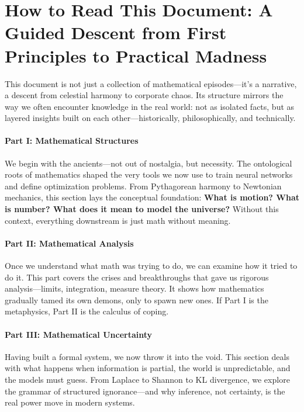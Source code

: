 \section{How to Read This Document: A Guided Descent from First Principles to Practical Madness}

This document is not just a collection of mathematical episodes—it’s a narrative, a descent from celestial harmony to corporate chaos. Its structure mirrors the way we often encounter knowledge in the real world: not as isolated facts, but as layered insights built on each other—historically, philosophically, and technically.

\paragraph{Part I: Mathematical Structures}
We begin with the ancients—not out of nostalgia, but necessity. The ontological roots of mathematics shaped the very tools we now use to train neural networks and define optimization problems. From Pythagorean harmony to Newtonian mechanics, this section lays the conceptual foundation: \textbf{What is motion? What is number? What does it mean to model the universe?} Without this context, everything downstream is just math without meaning.

\paragraph{Part II: Mathematical Analysis}
Once we understand what math was trying to do, we can examine how it tried to do it. This part covers the crises and breakthroughs that gave us rigorous analysis—limits, integration, measure theory. It shows how mathematics gradually tamed its own demons, only to spawn new ones. If Part I is the metaphysics, Part II is the calculus of coping.

\paragraph{Part III: Mathematical Uncertainty}
Having built a formal system, we now throw it into the void. This section deals with what happens when information is partial, the world is unpredictable, and the models must guess. From Laplace to Shannon to KL divergence, we explore the grammar of structured ignorance—and why inference, not certainty, is the real power move in modern systems.

